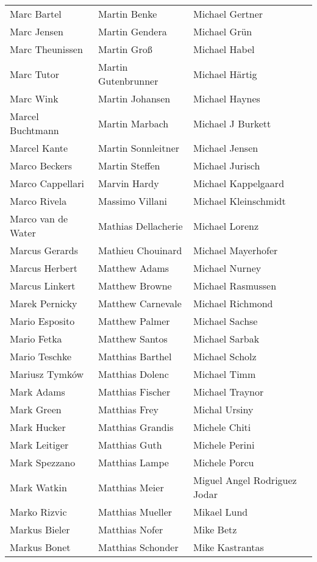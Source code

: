 \begin{tabular}{p{4.5cm}p{4.5cm}p{4.5cm}}
Marc Bartel & Martin Benke & Michael Gertner \\
Marc Jensen & Martin Gendera & Michael Grün \\
Marc Theunissen & Martin Groß & Michael Habel \\
Marc Tutor & Martin Gutenbrunner & Michael Härtig \\
Marc Wink & Martin Johansen & Michael Haynes \\
Marcel Buchtmann & Martin Marbach & Michael J Burkett \\
Marcel Kante & Martin Sonnleitner & Michael Jensen \\
Marco Beckers & Martin Steffen & Michael Jurisch \\
Marco Cappellari & Marvin Hardy & Michael Kappelgaard \\
Marco Rivela & Massimo Villani & Michael Kleinschmidt \\
Marco van de Water & Mathias Dellacherie & Michael Lorenz \\
Marcus Gerards & Mathieu Chouinard & Michael Mayerhofer \\
Marcus Herbert & Matthew Adams & Michael Nurney \\
Marcus Linkert & Matthew Browne & Michael Rasmussen \\
Marek Pernicky & Matthew Carnevale & Michael Richmond \\
Mario Esposito & Matthew Palmer & Michael Sachse \\
Mario Fetka & Matthew Santos & Michael Sarbak \\
Mario Teschke & Matthias Barthel & Michael Scholz \\
Mariusz Tymków & Matthias Dolenc & Michael Timm \\
Mark Adams & Matthias Fischer & Michael Traynor \\
Mark Green & Matthias Frey & Michal Ursiny \\
Mark Hucker & Matthias Grandis & Michele Chiti \\
Mark Leitiger & Matthias Guth & Michele Perini \\
Mark Spezzano & Matthias Lampe & Michele Porcu \\
Mark Watkin & Matthias Meier & Miguel Angel Rodriguez Jodar \\
Marko Rizvic & Matthias Mueller & Mikael Lund \\
Markus Bieler & Matthias Nofer & Mike Betz \\
Markus Bonet & Matthias Schonder & Mike Kastrantas \\

\end{tabular}
